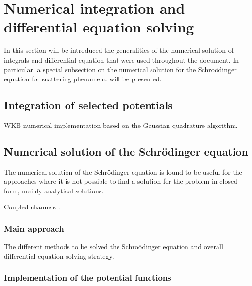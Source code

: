 \documentclass[openany]{book}
\begin{document}
\cite{descouvemont_2016}
\cite{thompson_deboer_dimitriou_kunieda_pigni_arbanas_leeb_srdinko_hale_tamagno_et_2019}
\cite{azuma_uberseder_simpson_brune_costantini_deboer_gorres_heil_leblanc_ugalde_et_2010}

\chapter{Numerical integration and differential equation solving} \label{ap:numericalSolving}


In this section will be introduced the generalities of the numerical solution of integrals and differential equation that were used throughout the document. In particular, a special subsection on the numerical solution for the Schroödinger equation for scattering phenomena will be presented. 

\section{Integration of selected potentials} \label{sec:integrationPotentials}

WKB numerical implementation based on the Gaussian quadrature algorithm.


\section{Numerical solution of the Schrödinger equation} \label{sec:schrodingerSolution}

The numerical solution of the Schrödinger equation is found to be useful for the approaches where it is not possible to find a solution for the problem in closed form, mainly analytical solutions. 

\cite{salvat_fernandez-varea_2019}

Coupled channels \cite{hagino_rowley_kruppa_1999}.

\subsection{Main approach} \label{sub:diffSolvingMainApproach}

The different methods to be solved the Schroödinger equation and overall differential equation solving strategy. 

\subsection{Implementation of the potential functions} \label{sub:diffSolvingPotential}
\end{document}
